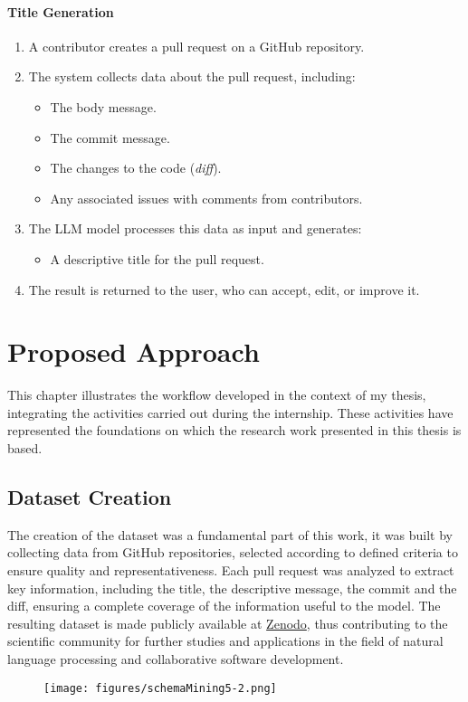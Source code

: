 \begin{itemize}
	\subsubsection{Title Generation}
	\begin{enumerate}
		\item A contributor creates a pull request on a GitHub repository.
		\item The system collects data about the pull request, including:
		\begin{itemize}
			\item The body message.
			\item The commit message.
			\item The changes to the code (\textit{diff}).
			\item Any associated issues with comments from contributors.
		\end{itemize}
		\item The LLM model processes this data as input and generates:
		\begin{itemize}
			\item A descriptive title for the pull request.
		\end{itemize}
		\item The result is returned to the user, who can accept, edit, or improve it.
	\end{enumerate}
\end{itemize}
\chapter{Proposed Approach}
This chapter illustrates the workflow developed in the context of my thesis, integrating the activities carried out during the internship. These activities have represented the foundations on which the research work presented in this thesis is based.
\section{Dataset Creation}
The creation of the dataset was a fundamental part of this work, it was built by collecting data from GitHub repositories, selected according to defined criteria to ensure quality and representativeness. Each pull request was analyzed to extract key information, including the title, the descriptive message, the commit and the diff, ensuring a complete coverage of the information useful to the model.
The resulting dataset is made publicly available at \href{https://zenodo.org/records/14546914?token=eyJhbGciOiJIUzUxMiJ9.eyJpZCI6IjBhODI4NDk5LTdlODItNDZhZS1iZDgwLWEwNDUwMWQyOTg3YSIsImRhdGEiOnt9LCJyYW5kb20iOiIzZTFjYTBmMjkxMGRkNmVkYTY5M2Y2ZDFlODAyYTdmYyJ9.IiQkMkHUAq2AzlhwHkaLyXBMDycStf--_gtWm1ZCQadw9IFWeaJakTNiXLE4PNPnm-cPYi63f1vPUfEy-lyo_Q}{Zenodo}, thus contributing to the scientific community for further studies and applications in the field of natural language processing and collaborative software development.
\begin{figure}[H] 
	\centering
	\texttt{[image: figures/schemaMining5-2.png]}
\end{figure}

